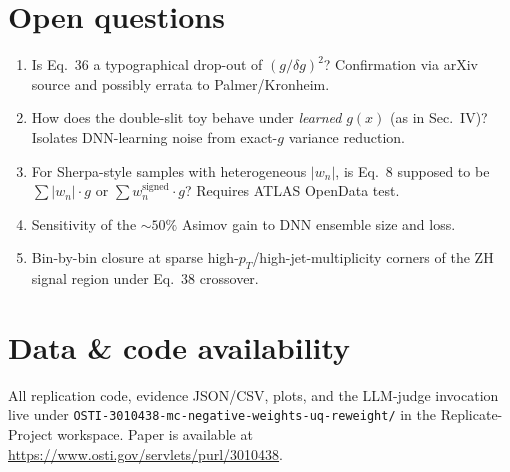 \documentclass[11pt,letterpaper]{article}
\begin{document}
\section{Open questions}
\begin{enumerate}
  \item[Q1.] Is Eq.~36 a typographical drop-out of $(g/\delta g)^2$? Confirmation via arXiv
    source and possibly errata to Palmer/Kronheim.
  \item[Q2.] How does the double-slit toy behave under \emph{learned} $g(x)$ (as in Sec.~IV)?
    Isolates DNN-learning noise from exact-$g$ variance reduction.
  \item[Q3.] For Sherpa-style samples with heterogeneous $|w_n|$, is Eq.~8 supposed to be
    $\sum |w_n| \cdot g$ or $\sum w_n^\text{signed} \cdot g$? Requires ATLAS OpenData test.
  \item[Q4.] Sensitivity of the $\sim 50\%$ Asimov gain to DNN ensemble size and loss.
  \item[Q5.] Bin-by-bin closure at sparse high-$p_T$/high-jet-multiplicity corners of the
    ZH signal region under Eq.~38 crossover.
\end{enumerate}

\section*{Data \& code availability}
All replication code, evidence JSON/CSV, plots, and the LLM-judge invocation live under
\texttt{OSTI-3010438-mc-negative-weights-uq-reweight/} in the Replicate-Project workspace.
Paper is available at \url{https://www.osti.gov/servlets/purl/3010438}.
\end{document}
